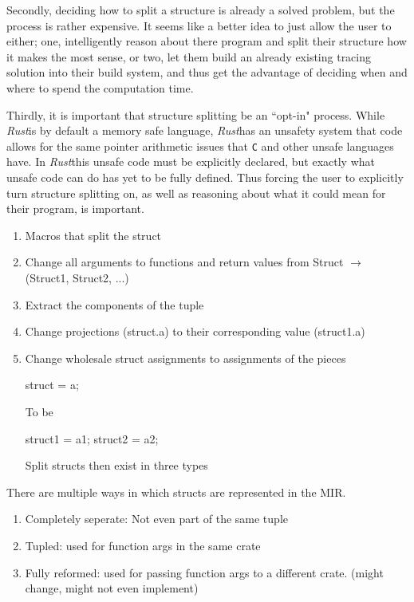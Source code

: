 \documentclass[12pt,final]{article}
\newcommand{\rustname}{{\small \em Rust}}
\def\rust{\rustname}
\begin{document}
Secondly, deciding how to split a structure is already a solved problem,
but the process is rather expensive. It seems like a better idea to just allow the user to either; one, 
intelligently reason about there program and split their structure how it makes the most sense, or two, 
let them build an already existing tracing solution into their build system, and thus get the advantage
of deciding when and where to spend the computation time.

Thirdly, it is important that structure splitting be an ``opt-in" process. While \rust is by default
a memory safe language, \rust has an unsafety system that code allows for the same pointer arithmetic 
issues that \texttt{C} and other unsafe languages have. In \rust this unsafe code must be explicitly
declared, but exactly what unsafe code can do has yet to be fully defined. Thus forcing the user to explicitly 
turn structure splitting on, as well as reasoning about what it could mean for their program, is important.

\begin{enumerate}
\item Macros that split the struct
\item Change all arguments to functions and return values from Struct $\rightarrow$ (Struct1, Struct2, ...)
\item Extract the components of the tuple 
\item Change projections (struct.a) to their corresponding value (struct1.a)
\item Change wholesale struct assignments to assignments of the pieces 

struct = a;

To be

struct1 = a1;
struct2 = a2;

Split structs then exist in three types

\end{enumerate}

There are multiple ways in which structs are represented in the MIR. 
\begin{enumerate}
\item Completely seperate: Not even part of the same tuple
\item Tupled: used for function args in the same crate
\item Fully reformed: used for passing function args to a different crate. (might change, might not even implement)
\end{enumerate}
\end{document}
